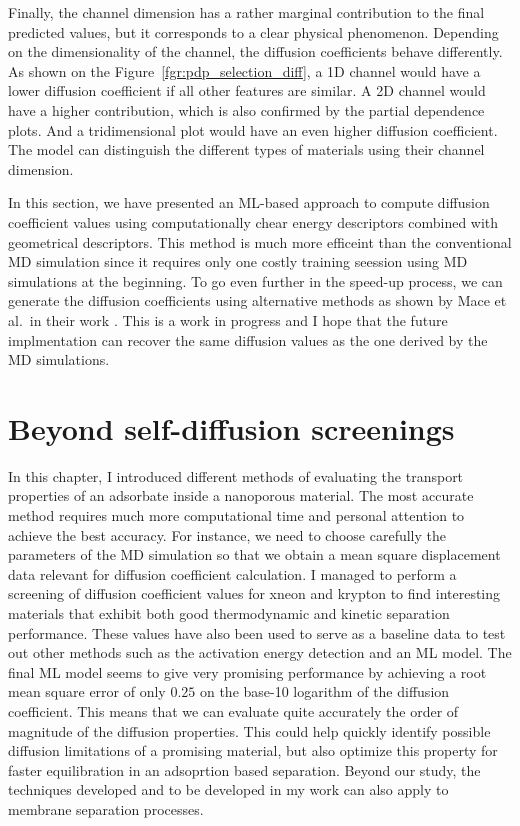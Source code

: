 \documentclass[main]{subfiles}
\begin{document}
Finally, the channel dimension has a rather marginal contribution to the final predicted values, but it corresponds to a clear physical phenomenon. Depending on the dimensionality of the channel, the diffusion coefficients behave differently. As shown on the Figure~\ref{fgr:pdp_selection_diff}, a 1D channel would have a lower diffusion coefficient if all other features are similar. A 2D channel would have a higher contribution, which is also confirmed by the partial dependence plots. And a tridimensional plot would have an even higher diffusion coefficient. The model can distinguish the different types of materials using their channel dimension.

In this section, we have presented an ML-based approach to compute diffusion coefficient values using computationally chear energy descriptors combined with geometrical descriptors. This method is much more efficeint than the conventional MD simulation since it requires only one costly training seession using MD simulations at the beginning. To go even further in the speed-up process, we can generate the diffusion coefficients using alternative methods as shown by Mace et al.\ in their work \autocite{Mace_2019}. This is a work in progress and I hope that the future implmentation can recover the same diffusion values as the one derived by the MD simulations.

\clearpage
\section{Beyond self-diffusion screenings}

In this chapter, I introduced different methods of evaluating the transport properties of an adsorbate inside a nanoporous material. The most accurate method requires much more computational time and personal attention to achieve the best accuracy. For instance, we need to choose carefully the parameters of the MD simulation so that we obtain a mean square displacement data relevant for diffusion coefficient calculation. I managed to perform a screening of diffusion coefficient values for xneon and krypton to find interesting materials that exhibit both good thermodynamic and kinetic separation performance. These values have also been used to serve as a baseline data to test out other methods such as the activation energy detection and an ML model. The final ML model seems to give very promising performance by achieving a root mean square error of only $0.25$ on the base-10 logarithm of the diffusion coefficient. This means that we can evaluate quite accurately the order of magnitude of the diffusion properties. This could help quickly identify possible diffusion limitations of a promising material, but also optimize this property for faster equilibration in an adsoprtion based separation. Beyond our study, the techniques developed and to be developed in my work can also apply to membrane separation processes.
\end{document}
